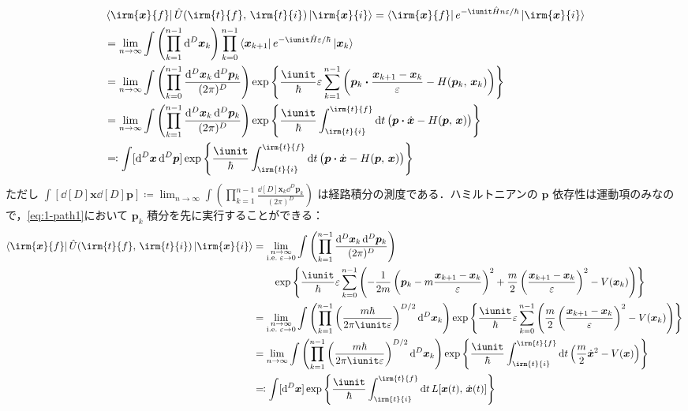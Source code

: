 \documentclass[TQFT_main]{subfiles}
\begin{document}
\begin{align}
    &\bra{\irm{\bm{x}}{f}} \hat{U}(\irm{t}{f},\, \irm{t}{i}) \ket{\irm{\bm{x}}{i}} 
    = \bra{\irm{\bm{x}}{f}} e^{-\iunit \hat{H}n\varepsilon /\hbar} \ket{\irm{\bm{x}}{i}} \\
    &= \lim_{n\to \infty}\int \left(\prod_{k=1}^{n-1} \dd[D]{\bm{x}_k} \right) \prod_{k=0}^{n-1} \bra{\bm{x}_{k+1}} e^{-\iunit \hat{H} \varepsilon / \hbar} \ket{\bm{x}_k} \\
    &= \lim_{n\to \infty}\int \left(\prod_{k=0}^{n-1}  \frac{\dd[D]{\bm{x}_k}\dd^D \bm{p}_k}{(2\pi)^D} \right) \exp\left\{ \frac{\iunit}{\hbar} \varepsilon \sum_{k=1}^{n-1} \left(\bm{p}_k \vdot \frac{\bm{x}_{k+1} - \bm{x}_k }{\varepsilon} - H (\bm{p}_k,\, \bm{x}_k) \right)  \right\}  \label{eq:1-path1} \\ 
    &= \lim_{n\to \infty}\int \left(\prod_{k=1}^{n-1}  \frac{\dd[D]{\bm{x}_k}\dd^D \bm{p}_k}{(2\pi)^D} \right) \exp\left\{ \frac{\iunit}{\hbar} \int_{\irm{t}{i}}^{\irm{t}{f}} \dd{t} \bigl(\bm{p} \vdot \dot{\bm{x}} - H (\bm{p},\, \bm{x}) \bigr)  \right\} \\
    &\eqqcolon \int [\dd[D]{\bm{x}} \dd[D]{\bm{p}}] \exp\left\{ \frac{\iunit}{\hbar} \int_{\irm{t}{i}}^{\irm{t}{f}} \dd{t} \bigl(\bm{p} \vdot \dot{\bm{x}} - H (\bm{p},\, \bm{x}) \bigr)  \right\}
\end{align}
ただし $\int [\dd[D]{\bm{x}} \dd[D]{\bm{p}}] \coloneqq \lim_{n\to \infty}\int \left(\prod_{k=1}^{n-1}  \frac{\dd[D]{\bm{x}_k}\dd^D \bm{p}_k}{(2\pi)^D} \right)$ は経路積分の測度である．ハミルトニアンの $\bm{p}$ 依存性は運動項のみなので，\eqref{eq:1-path1}において $\bm{p}_k$ 積分を先に実行することができる：
\begin{align}
    \bra{\irm{\bm{x}}{f}} \hat{U}(\irm{t}{f},\, \irm{t}{i}) \ket{\irm{\bm{x}}{i}} 
    &= \lim_{\substack{n\to \infty \\ \mathrm{i.e.}\; \varepsilon \to 0}}\int \left(\prod_{k=1}^{n-1}  \frac{\dd[D]{\bm{x}_k}\dd^D \bm{p}_k}{(2\pi)^D} \right) \\
    &\qquad \exp\left\{ \frac{\iunit}{\hbar} \varepsilon \sum_{k=0}^{n-1} \left(- \frac{1}{2m} \left( \bm{p}_k - m\frac{\bm{x}_{k+1} - \bm{x}_k}{\varepsilon} \right)^2 + \frac{m}{2} \left( \frac{\bm{x}_{k+1} - \bm{x}_k}{\varepsilon} \right)^2 - V(\bm{x}_k) \right)  \right\} \\ 
    &= \lim_{\substack{n\to \infty \\ \mathrm{i.e.}\; \varepsilon \to 0}}\int \left(\prod_{k=1}^{n-1}  \left(\frac{m\hbar}{2\pi \iunit \varepsilon}\right)^{D/2} \dd[D]{\bm{x}_k} \right) \exp\left\{ \frac{\iunit}{\hbar} \varepsilon \sum_{k=0}^{n-1} \left(\frac{m}{2} \left( \frac{\bm{x}_{k+1} - \bm{x}_k}{\varepsilon} \right)^2 - V(\bm{x}_k) \right)  \right\} \\
    &= \lim_{n\to \infty}\int \left(\prod_{k=1}^{n-1}  \left(\frac{m\hbar}{2\pi \iunit \varepsilon}\right)^{D/2} \dd[D]{\bm{x}_k} \right) \exp\left\{ \frac{\iunit}{\hbar} \int_{\irm{t}{i}}^{\irm{t}{f}} \dd{t} \left(\frac{m}{2} \dot{\bm{x}}^2 - V(\bm{x}) \right)  \right\} \\
    &\eqqcolon \int [\dd[D]{\bm{x}}] \exp \left\{ \frac{\iunit}{\hbar} \int_{\irm{t}{i}}^{\irm{t}{f}} \dd{t} L [\bm{x}(t),\, \dot{\bm{x}} (t)] \right\} 
\end{align}
\end{document}
